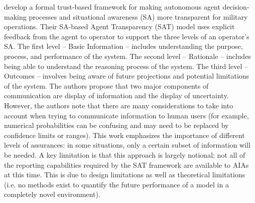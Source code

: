 \citet{Chen2014-dk} develop a formal trust-based framework for making autonomous agent decision-making processes and situational awareness (SA) \cite{Endsley1995-ie} more transparent for military operations. Their SA-based Agent Transparency (SAT) model uses explicit feedback from the agent to operator to support the three levels of an operator's SA. 
The first level -- Basic Information -- includes understanding the purpose, process, and performance of the system. 
The second level -- Rationale -- includes being able to understand the reasoning process of the system. 
The third level -- Outcomes -- involves being aware of future projections and potential limitations of the system. 
The authors propose that two major components of communication are display of information and the display of uncertainty. 
However, the authors note that there are many considerations to take into account when trying to communicate information to human users (for example, numerical probabilities can be confusing and may need to be replaced by confidence limits or ranges). 
This work emphasizes the importance of different levels of assurances: in some situations, only a certain subset of information will be needed. 
A key limitation is that this approach is largely notional; not all of the reporting capabilities required by the SAT framework are available to AIAs at this time. 
This is due to design limitations as well as theoretical limitations (i.e. no methods exist to quantify the future performance of a model in a completely novel environment). 

